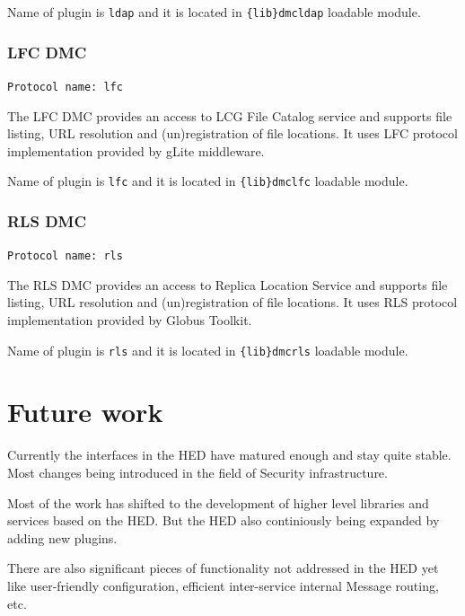 \documentclass{book}
\begin{document}
Name of plugin is \texttt{ldap} and it is located in \texttt{\{lib\}dmcldap} loadable module.


\subsection{LFC DMC}

\texttt{Protocol name: lfc}

The LFC DMC provides an access to LCG File Catalog service and supports file listing, URL resolution and (un)registration of file locations. It uses LFC protocol implementation provided by gLite middleware.

Name of plugin is \texttt{lfc} and it is located in \texttt{\{lib\}dmclfc} loadable module.


\subsection{RLS DMC}

\texttt{Protocol name: rls}

The RLS DMC provides an access to Replica Location Service and supports file listing, URL resolution and (un)registration of file locations. It uses RLS protocol implementation provided by Globus Toolkit.

Name of plugin is \texttt{rls} and it is located in \texttt{\{lib\}dmcrls} loadable module.


\chapter{Future work}

Currently the interfaces in the HED have matured enough and stay quite stable. Most changes being introduced in the field of Security infrastructure.

Most of the work has shifted to the development of higher level libraries and services based on the HED. But the HED also continiously being expanded by adding new plugins.

There are also significant pieces of functionality not addressed in the HED yet like user-friendly configuration, efficient inter-service internal Message routing, etc.



\end{document}
